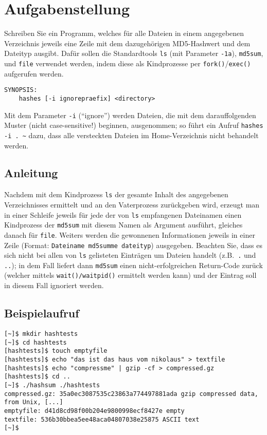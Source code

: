 




\section*{Aufgabenstellung}

Schreiben Sie ein Programm, welches für alle Dateien in einem angegebenen
Verzeichnis jeweils eine Zeile mit dem dazugehörigen MD5-Hashwert und dem
Dateityp ausgibt. Dafür sollen die Standardtools \texttt{ls} (mit Parameter
\texttt{-1a}), \texttt{md5sum}, und \texttt{file} verwendet werden, indem
diese als Kindprozesse per \texttt{fork()}/\texttt{exec()} aufgerufen
werden.


\begin{verbatim}
SYNOPSIS:
	hashes [-i ignorepraefix] <directory>
\end{verbatim}

Mit dem Parameter \verb_-i_ (“ignore”) werden Dateien, die mit dem
darauffolgenden Muster (nicht case-sensitive!) beginnen, ausgenommen;
so führt ein Aufruf \verb_hashes -i . ~_ dazu, dass alle versteckten
Dateien im Home-Verzeichnis nicht behandelt werden.


\subsection*{Anleitung}
Nachdem mit dem Kindprozess \texttt{ls} der gesamte Inhalt des angegebenen
Verzeichnisses ermittelt und an den Vaterprozess zurückgeben wird, erzeugt man
in einer Schleife jeweils für jede der von \texttt{ls} empfangenen Dateinamen
einen Kindprozess der \texttt{md5sum} mit diesem Namen als Argument ausführt,
gleiches danach für \texttt{file}. Weiters werden die gewonnenen Informationen
jeweils in einer Zeile (Format: \texttt{Dateiname md5summe dateityp})
ausgegeben. Beachten Sie, dass es sich nicht bei allen von \texttt{ls}
gelisteten Einträgen um Dateien handelt (z.B.\ \texttt{.} und \texttt{..}); in dem Fall liefert dann
\texttt{md5sum} einen nicht-erfolgreichen Return-Code zurück (welcher
mittels \texttt{wait()/waitpid()} ermittelt werden kann) und der Eintrag soll in
diesem Fall ignoriert werden.

\subsection*{Beispielaufruf}
\begin{verbatim}
[~]$ mkdir hashtests
[~]$ cd hashtests
[hashtests]$ touch emptyfile
[hashtests]$ echo "das ist das haus vom nikolaus" > textfile
[hashtests]$ echo "compressme" | gzip -cf > compressed.gz
[hashtests]$ cd ..
[~]$ ./hashsum ./hashtests
compressed.gz: 35a0ec3087535c23863a774497881ada gzip compressed data, from Unix, [...]
emptyfile: d41d8cd98f00b204e9800998ecf8427e empty
textfile: 536b30bbea5ee48aca04807038e25875 ASCII text
[~]$
\end{verbatim}

\osueguidelinestwo


